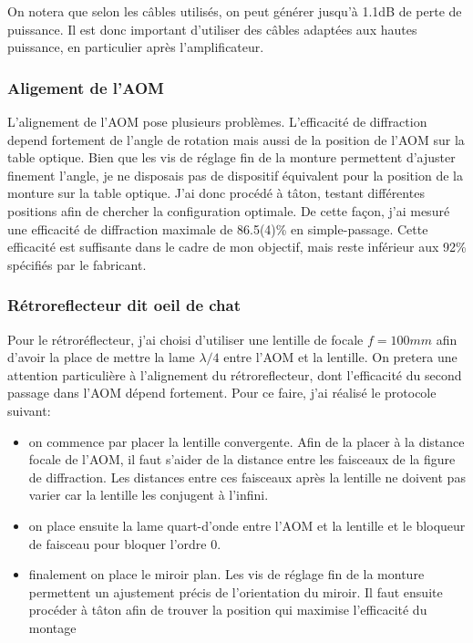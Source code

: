 \documentclass[12pt, a4paper]{article}
\begin{document}
On notera que selon les câbles utilisés, on peut générer jusqu'à 1.1dB de perte de puissance. Il est donc important d'utiliser des câbles adaptées aux hautes puissance, en particulier après l'amplificateur. 

\subsubsection{Aligement de l'AOM}\label{subsubsec:AOMalignment}

L'alignement de l'AOM pose plusieurs problèmes. L'efficacité de diffraction depend fortement de l'angle de rotation mais aussi de la position de l'AOM sur la table optique. Bien que les vis de réglage fin de la monture permettent d'ajuster finement l'angle, je ne disposais pas de dispositif équivalent pour la position de la monture sur la table optique. J'ai donc procédé à tâton, testant différentes positions afin de chercher la configuration optimale. De cette façon, j'ai mesuré une efficacité de diffraction maximale de 86.5(4)\% en simple-passage. Cette efficacité est suffisante dans le cadre de mon objectif, mais reste inférieur aux 92\% spécifiés par le fabricant. 

\subsubsection{Rétroreflecteur dit \og oeil de chat\fg}\label{subsubsec:catseye}

Pour le rétroréflecteur, j'ai choisi d'utiliser une lentille de focale \(f=100mm\) afin d'avoir la place de mettre la lame \(\lambda/4\) entre l'AOM et la lentille. On pretera une attention particulière à l'alignement du rétroreflecteur, dont l'efficacité du second passage dans l'AOM dépend fortement. Pour ce faire, j'ai réalisé le protocole suivant:
\begin{itemize}
  \item on commence par placer la lentille convergente. Afin de la placer à la distance focale de l'AOM, il faut s'aider de la distance entre les faisceaux de la figure de diffraction. Les distances entre ces faisceaux après la lentille ne doivent pas varier car la lentille les conjugent à l'infini. 
  \item on place ensuite la lame quart-d'onde entre l'AOM et la lentille et le bloqueur de faisceau pour bloquer l'ordre 0.
  \item finalement on place le miroir plan. Les vis de réglage fin de la monture permettent un ajustement précis de l'orientation du miroir. Il faut ensuite procéder à tâton afin de trouver la position qui maximise l'efficacité du montage
\end{itemize}
\end{document}
